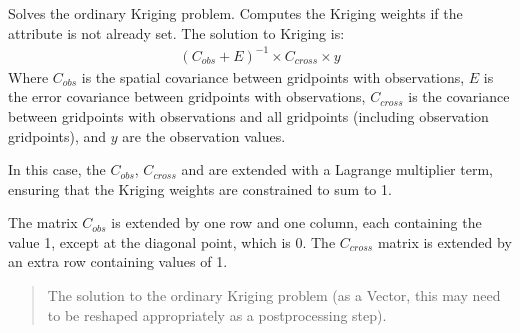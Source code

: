 \documentclass[letterpaper,10pt,english]{sphinxmanual}
\begin{document}
\begin{fulllineitems}
\begin{fulllineitems}
\begin{quote}
\begin{description}
\sphinxAtStartPar
{}

\end{description}\end{quote}

\end{fulllineitems}


\begin{fulllineitems}
\label{\detokenize{kriging:glomar_gridding.kriging.OrdinaryKriging.solve}}
\pysigstartsignatures
\pysiglinewithargsret
{}
{}
{}
\pysigstopsignatures
\sphinxAtStartPar
Solves the ordinary Kriging problem. Computes the Kriging weights if the
 attribute is not already set. The solution to Kriging
is:
\begin{equation*}
\begin{split}(C_{obs} + E)^{-1} \times C_{cross} \times y\end{split}
\end{equation*}
\sphinxAtStartPar
Where \(C_{obs}\) is the spatial covariance between grid\sphinxhyphen{}points
with observations, \(E\) is the error covariance between grid\sphinxhyphen{}points
with observations, \(C_{cross}\) is the covariance between
grid\sphinxhyphen{}points with observations and all grid\sphinxhyphen{}points (including observation
grid\sphinxhyphen{}points), and \(y\) are the observation values.

\sphinxAtStartPar
In this case, the \(C_{obs}\), \(C_{cross}\) and are extended
with a Lagrange multiplier term, ensuring that the Kriging weights are
constrained to sum to 1.

\sphinxAtStartPar
The matrix \(C_{obs}\) is extended by one row and one column, each
containing the value 1, except at the diagonal point, which is 0. The
\(C_{cross}\) matrix is extended by an extra row containing values
of 1.
\begin{quote}\begin{description}
\sphinxAtStartPar
The solution to the ordinary Kriging problem (as a Vector, this may
need to be re\sphinxhyphen{}shaped appropriately as a post\sphinxhyphen{}processing step).

\sphinxAtStartPar
{}


\end{description}
\end{quote}
\end{fulllineitems}
\end{fulllineitems}
\end{document}
